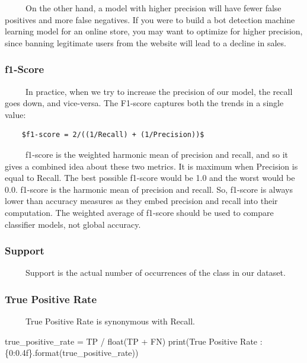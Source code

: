 \documentclass[
  letterpaper,
  DIV=11,
  numbers=noendperiod]{scrreprt}
\newenvironment{Shaded}{\begin{snugshade}}{\end{snugshade}}
\newcommand{\BuiltInTok}[1]{\textcolor[rgb]{0.00,0.23,0.31}{#1}}
\newcommand{\NormalTok}[1]{\textcolor[rgb]{0.00,0.23,0.31}{#1}}
\newcommand{\OperatorTok}[1]{\textcolor[rgb]{0.37,0.37,0.37}{#1}}
\newcommand{\SpecialCharTok}[1]{\textcolor[rgb]{0.37,0.37,0.37}{#1}}
\newcommand{\StringTok}[1]{\textcolor[rgb]{0.13,0.47,0.30}{#1}}
\begin{document}
~~~~~On the other hand, a model with higher precision will have fewer
false positives and more false negatives. If you were to build a bot
detection machine learning model for an online store, you may want to
optimize for higher precision, since banning legitimate users from the
website will lead to a decline in sales.

\subsubsection{f1-Score}\label{f1-score}

~~~~~In practice, when we try to increase the precision of our model,
the recall goes down, and vice-versa. The F1-score captures both the
trends in a single value:

\begin{verbatim}
    $f1-score = 2/((1/Recall) + (1/Precision))$
\end{verbatim}

~~~~~f1-score is the weighted harmonic mean of precision and recall, and
so it gives a combined idea about these two metrics. It is maximum when
Precision is equal to Recall. The best possible f1-score would be 1.0
and the worst would be 0.0. f1-score is the harmonic mean of precision
and recall. So, f1-score is always lower than accuracy measures as they
embed precision and recall into their computation. The weighted average
of f1-score should be used to compare classifier models, not global
accuracy.

\subsubsection{Support}\label{support}

~~~~~Support is the actual number of occurrences of the class in our
dataset.

\subsubsection{True Positive Rate}\label{true-positive-rate}

~~~~~True Positive Rate is synonymous with Recall.

\begin{Shaded}
\begin{Highlighting}[]
\NormalTok{true\_positive\_rate }\OperatorTok{=}\NormalTok{ TP }\OperatorTok{/} \BuiltInTok{float}\NormalTok{(TP }\OperatorTok{+}\NormalTok{ FN)}
\BuiltInTok{print}\NormalTok{(}\StringTok{\textquotesingle{}True Positive Rate : }\SpecialCharTok{\{0:0.4f\}}\StringTok{\textquotesingle{}}\NormalTok{.}\BuiltInTok{format}\NormalTok{(true\_positive\_rate))}
\end{Highlighting}
\end{Shaded}
\end{document}
